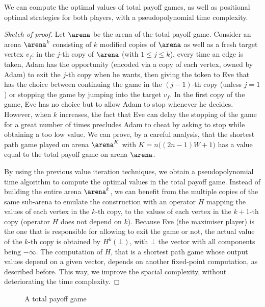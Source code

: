 \begin{theorem}\label{4-thm:TP-optimal-strategies}
  We can compute the optimal values of total payoff games, as well as
  positional optimal strategies for both players, with a
  pseudopolynomial time complexity.
\end{theorem}
\begin{proof}[Sketch of proof]
  Let $\arena$ be the arena of the total payoff game. Consider an
  arena $\arena^k$ consisting of $k$ modified copies of $\arena$ as
  well as a fresh target vertex $v_f$: in the $j$-th copy of $\arena$
  (with $1\leq j\leq k$), every time an edge is taken, Adam has the
  opportunity (encoded via a copy of each vertex, owned by Adam) to
  exit the $j$-th copy when he wants, then giving the token to Eve
  that has the choice between continuing the game in the $(j-1)$-th
  copy (unless $j=1$) or stopping the game by jumping into the target
  $v_f$. In the first copy of the game, Eve has no choice but to allow
  Adam to stop whenever he decides. However, when $k$ increases, the
  fact that Eve can delay the stopping of the game for a great number
  of times precludes Adam to cheat by asking to stop while obtaining a
  too low value. We can prove, by a careful analysis, that the
  shortest path game played on arena $\arena^K$ with
  $K= n\big((2n-1)W +1\big)$ has a value equal to the
  total payoff game on arena $\arena$.

  By using the previous value iteration techniques, we obtain a
  pseudopolynomial time algorithm to compute the optimal values in
  the total payoff game. Instead of building the entire arena
  $\arena^k$, we can benefit from the multiple copies of the same
  sub-arena to emulate the construction with an operator $H$ mapping
  the values of each vertex in the $k$-th copy, to the values of each
  vertex in the $k+1$-th copy (operator $H$ does not depend on
  $k$). Because Eve (the maximiser player) is the one that is
  responsible for allowing to exit the game or not, the actual value
  of the $k$-th copy is obtained by $H^k(\bot)$, with $\bot$ the
  vector with all components being $-\infty$. The computation of $H$,
  that is a shortest path game whose output values depend on a given
  vector, depends on another fixed-point computation, as described
  before. This way, we improve the spacial complexity, without
  deteriorating the time complexity.
\end{proof}



\begin{figure}[tbp]
  \centering

  \caption{A total payoff game}
  \label{4-fig:totalpayoff}
\end{figure}


